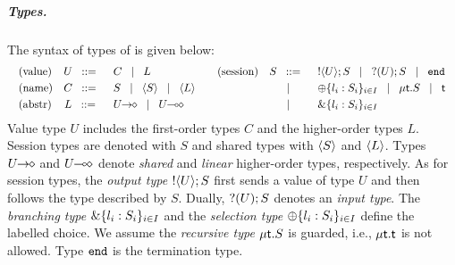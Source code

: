\documentclass[a4paper,UKenglish]{lipics}
\theoremstyle{definition}
\begin{document}
 

\subparagraph{Types.}
The syntax of types of \HOp is given below:
\[
	\begin{array}{cc}
		\begin{array}{lcl}
			\text{(value)} & U \bnfis & C \bnfbar L
			\\[1mm]
			\text{(name)} & C \bnfis & S \bnfbar \chtype{S} \bnfbar \chtype{L}
			\\[1mm]
			\text{(abstr)} & L \bnfis & \shot{U} \bnfbar \lhot{U}
		\end{array}
		&
		\begin{array}{lcl}
			\text{(session)} & S \bnfis &  \btout{U} S \bnfbar \btinp{U} S \bnfbar \tinact
			\\[1mm]
			&\bnfbar& \btsel{l_i:S_i}_{i \in I} \bnfbar \trec{t}{S} \bnfbar \vart{t}
			\\[1mm]
			&\bnfbar& \btbra{l_i:S_i}_{i \in I}
		\end{array}
	\end{array}
	\]
Value type $U$ includes
the first-order types $C$ and the higher-order
types $L$. Session types are denoted with $S$ and
shared types with $\langle S \rangle$ and $\langle L \rangle$.
Types $U\!\! \rightarrow\!\! \diamond$ and $U\!\! \multimap\!\! \diamond$ denote
{\em shared} and {\em linear} higher-order 
types, respectively.
As for session types,  
the {\em output type}
$! \langle U \rangle ; S$ %
first sends a value of
type $U$ and then follows the type described by $S$.  Dually,
$? (U) ; S$ denotes an {\em input type}. The {\em branching type}
$\& \{l_i:S_i\}_{i \in I}$ and the {\em selection type}
$\oplus \{l_i:S_i\}_{i \in I}$ define the labelled choice. 
We assume the {\em recursive type} $\mu\mathsf{t}.S$ is guarded,
i.e.,  $\mu\mathsf{t}.\mathsf{t}$ is not allowed. 
Type $\mathtt{end}$ is the termination type. 
\end{document}
